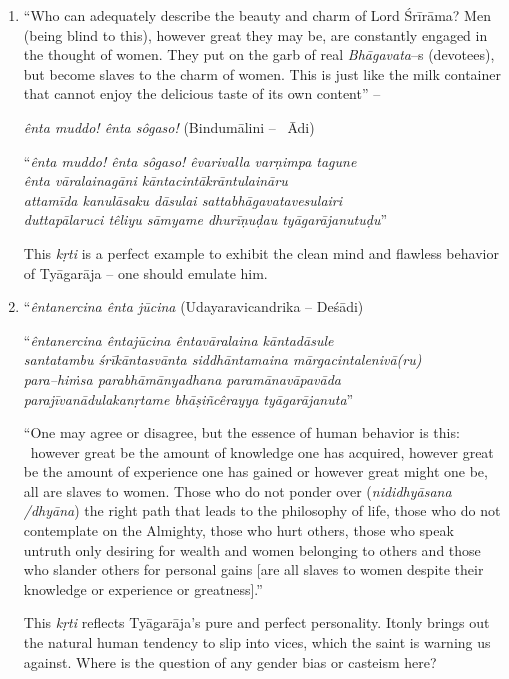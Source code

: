 \begin{enumerate}
 \item 
 “Who can adequately describe the beauty and charm of Lord Śrīrāma? Men (being blind to this), however great they may be, are constantly engaged in the thought of women. They put on the garb of real \textit{Bhāgavata}–s (devotees), but become slaves to the charm of women. This is just like the milk container that cannot enjoy the delicious taste of its own content” –

 \textit{ênta muddo! ênta sôgaso!} (Bindumālini –  Ādi)

\begin{myquote}
“\textit{ênta muddo! ênta sôgaso! êvarivalla varṇimpa tagune}\\\textit{ênta vāralainagāni kāntacintākrāntulaināru}\\\textit{attamīda kanulāsaku dāsulai sattabhāgavatavesulairi}\\\textit{duttapālaruci têliyu sāmyame dhurīṇuḍau tyāgarājanutuḍu}”
\end{myquote}

 This \textit{kṛti} is a perfect example to exhibit the clean mind and flawless behavior of Tyāgarāja – one should emulate him.

 \item 
 “\textit{êntanercina ênta jūcina} (Udayaravicandrika – Deśādi)

\begin{myquote}
“\textit{êntanercina êntajūcina êntavāralaina kāntadāsule}\\\textit{santatambu śrīkāntasvānta siddhāntamaina mārgacintalenivā(ru)}\\\textit{para–hiṁsa parabhāmānyadhana paramānavāpavāda} \\\textit{parajīvanādulakanṛtame bhāṣiñcêrayya tyāgarājanuta}”
\end{myquote}

 “One may agree or disagree, but the essence of human behavior is this:  however great be the amount of knowledge one has acquired, however great be the amount of experience one has gained or however great might one be, all are slaves to women. Those who do not ponder over (\textit{nididhyāsana /dhyāna}) the right path that leads to the philosophy of life, those who do not contemplate on the Almighty, those who hurt others, those who speak untruth only desiring for wealth and women belonging to others and those who slander others for personal gains [are all slaves to women despite their knowledge or experience or greatness].”

 This \textit{kṛti} reflects Tyāgarāja’s pure and perfect personality. Itonly brings out the natural human tendency to slip into vices, which the saint is warning us against. Where is the question of any gender bias or casteism here?

\end{enumerate}

